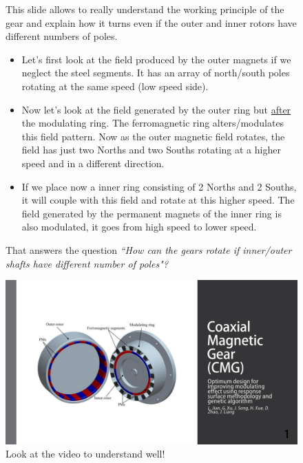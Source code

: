 \begin{figure}[H]
    \begin{minipage}{.45\linewidth}
        
       This slide allows to really understand the working principle of the gear and explain how it turns even if the outer and inner rotors have different numbers of poles. 
       
       
       \begin{itemize}
           \item Let’s first look at the field produced by the outer magnets if we neglect the steel segments. It has an array of north/south poles rotating at the same speed (low speed side). 
           \item Now let’s look at the field generated by the outer ring but \underline{after} the modulating ring. The ferromagnetic ring alters/modulates this field pattern. Now as the outer magnetic field rotates, the field has just two Norths and two Souths rotating at a higher speed and in a different direction.
           \item If we place now a inner ring consisting of 2 Norths and 2 Souths, it will couple with this field and rotate at this higher speed. The field generated by the permanent magnets of the inner ring is also modulated, it goes from high speed to lower speed.
       \end{itemize}
       
       That answers the question \textit{“How can the gears rotate if inner/outer shafts have different number of poles"?}


    \end{minipage}
    \hfill%
    \begin{minipage}[c]{.45\linewidth}
        \centering
        \includegraphics[page={11},width=\textwidth]{LELEC2311.allow.pdf}
        \caption{Look at the video to understand well!}
    \end{minipage}
\end{figure}


